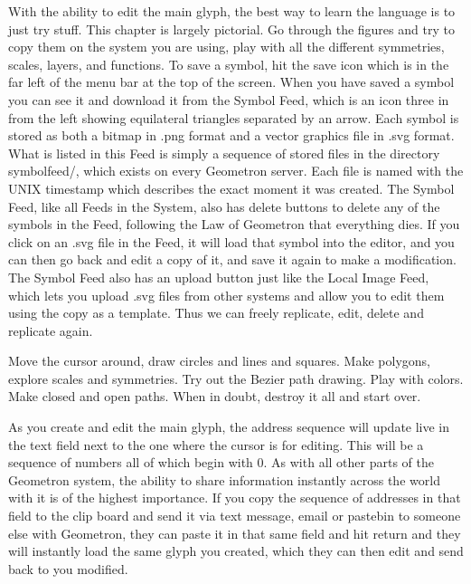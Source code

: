 With the ability to edit the main glyph, the best way to learn the language is to just try stuff.  This chapter is largely pictorial.  Go through the figures and try to copy them on the system you are using, play with all the different symmetries, scales, layers, and functions.  To save a symbol, hit the save icon which is in the far left of the menu bar at the top of the screen.  When you have saved a symbol you can see it and download it from the Symbol Feed, which is an icon three in from the left showing equilateral triangles separated by an arrow.  Each symbol is stored as both a bitmap in .png format and a vector graphics file in .svg format.  What is listed in this Feed is simply a sequence of stored files in the directory symbolfeed/, which exists on every Geometron server.  Each file is named with the UNIX timestamp which describes the exact moment it was created.   The Symbol Feed, like all Feeds in the System, also has delete buttons to delete any of the symbols in the Feed, following the Law of Geometron that everything dies.  If you click on an .svg file in the Feed, it will load that symbol into the editor, and you can then go back and edit a copy of it, and save it again to make a modification.  The Symbol Feed also has an upload button just like the Local Image Feed, which lets you upload .svg files from other systems and allow you to edit them using the copy as a template.  Thus we can freely replicate, edit, delete and replicate again.

Move the cursor around, draw circles and lines and squares.  Make polygons, explore scales and symmetries. Try out the Bezier path drawing.  Play with colors.  Make closed and open paths.  When in doubt, destroy it all and start over. 

As you create and edit the main glyph, the address sequence will update live in the text field next to the one where the cursor is for editing.  This will be a sequence of numbers all of which begin with 0.  As with all other parts of the Geometron system, the ability to share information instantly across the world with it is of the highest importance. If you copy the sequence of addresses in that field to the clip board and send it via text message, email or pastebin to someone else with Geometron, they can paste it in that same field and hit return and they will instantly load the same glyph you created, which they can then edit and send back to you modified.  


